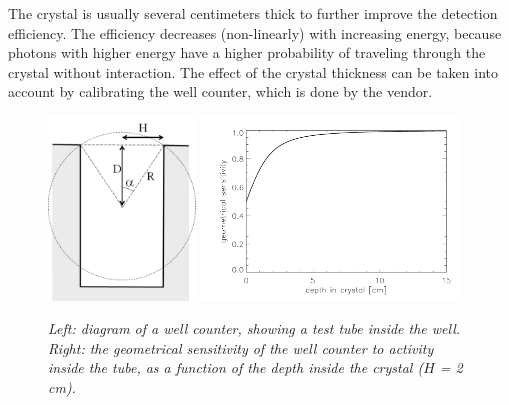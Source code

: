\documentclass[11pt,oneside]{book}
\begin{document}
The crystal is usually several centimeters thick to further improve
the detection efficiency. The efficiency decreases (non-linearly) with
increasing energy, because photons with higher energy have a higher
probability of traveling through the crystal without interaction. The
effect of the crystal thickness can be taken into account by
calibrating the well counter, which is done by the vendor.
%
\begin{figure}[tb]
  \includegraphics[width=0.35\textwidth]{figs/fig_wellcountersens.pdf}
  \includegraphics[width=0.61\textwidth]{figs/fig_wellcounter2.pdf}
\caption{\label{fig:wellcountersens} \emph{Left: diagram of a well counter, showing a
    test tube inside the well. Right: the geometrical sensitivity of
    the well counter to activity inside the tube, as a function of the
    depth inside the crystal ($H$ = 2 cm).}}
\end{figure}
\end{document}
